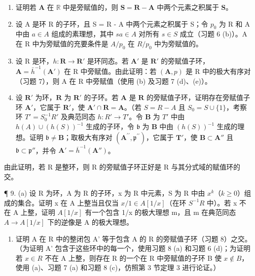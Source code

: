 \begin{enumerate}
\def\labelenumi{(\alph{enumi})}
\item
  证明若 \(\mathbf{A}\) 在 \(\mathbb{R}\) 中是旁赋值的，则 \(\mathbf{S} = \mathbf{R} - \mathbf{A}\) 中两个元素之积属于 \(\mathbf{S}\)。
\item
  设 A 是环 R 的子环，且 S = R - A 中两个元素之积属于 S；令 \(p_{0}\) 为 R 和 A 中由 \(a \in A\) 组成的素理想，其中 \(sa \in A\) 对所有 \(s \in S\) 成立（习题 6 (b)）。A 在 R 中为旁赋值的充要条件是 \(A/p_{0}\) 在 \(R/p_{0}\) 中为旁赋值的。
\item
  设 R 是环，\(h: \mathbf{R} \to \mathbf{R}'\) 是环同态。若 \(\mathbf{A}'\) 是 \(\mathbf{R}'\) 的旁赋值子环，\(\mathbf{A} = \bar{h}^{-1}(\mathbf{A}')\) 在 R 中旁赋值。由此证明：若 \((\mathbf{A}, p)\) 是 R 中的极大有序对（习题 7），则 A 在 R 中旁赋值（使用 (b) 及习题 7 (d)、(e)）。
\item
  设 \(\mathbf{R}'\) 为环，\(\mathbf{R}\) 为 \(\mathbf{R}'\) 的子环。若 \(\mathbf{A}\) 是 \(\mathbf{R}\) 的旁赋值子环，证明存在旁赋值子环 \(\mathbf{A}'\)，它属于 \(\mathbf{R}'\)，使 \(\mathbf{A}' \cap \mathbf{R} = \mathbf{A}\)。（若 \(S = R - A\) 且 \(S_0 = S \cup \{1\}\)，考察环 \(T' = S_0^{-1}R'\) 及典范同态 \(h: R' \to T'\)。令 \(\mathbf{B}\) 为 \(T'\) 中由 \(h(A) \cup (h(S))^{-1}\) 生成的子环，令 \(\mathfrak{b}\) 为 \(\mathbf{B}\) 中由 \((h(S))^{-1}\) 生成的理想。证明 \(\mathfrak{b} \neq \mathbf{B}\)；取极大有序对 \((\mathbf{A}^{\prime \prime}, \mathfrak{p}^{\prime \prime})\)，它属于 \(\mathbf{T}'\)，使 \(\mathbf{B} \subset \mathbf{A}''\) 且 \(\mathfrak{b} \subset \mathfrak{p}''\)，并令 \(\mathbf{A}' = \overline{h}^{-1}(\mathbf{A}'')\)。
\end{enumerate}

由此证明，若 R 是整环，则 R 的旁赋值子环正好是 R 与其分式域的赋值环的交。

¶ 9. (a) 设 R 为环，A 为 R 的子环，x 为 R 中元素，S 为 R 中由 \(x^{k}\)（\(k \geqslant 0\)）组成的集合。证明 x 在 A 上整当且仅当 \(x/1 \in A[1/x]\)（在环 \(S^{-1}R\) 中）。若 x 不在 A 上整，证明 \(A[1/x]\) 有一个包含 1/x 的极大理想 m，且 m 在典范同态 \(A \to A[1/x]\) 下的逆像是 A 的极大理想。

\begin{enumerate}
\def\labelenumi{(\alph{enumi})}
\setcounter{enumi}{1}
\tightlist
\item
  证明 A 在 R 中的整闭包 A' 等于包含 A 的 R 的旁赋值子环（习题 8）之交。（为证明 A' 包含于这些环中的每一个，使用习题 8 (a) 和习题 6 (d)；为证明若 \(x \in R\) 不在 A 上整，则存在 R 的一个在 R 中旁赋值的子环 B 使 \(x \notin B\)，使用 (a)、习题 7 (a) 和习题 8 (c)，仿照第 3 节定理 3 进行论证。）
\end{enumerate}

